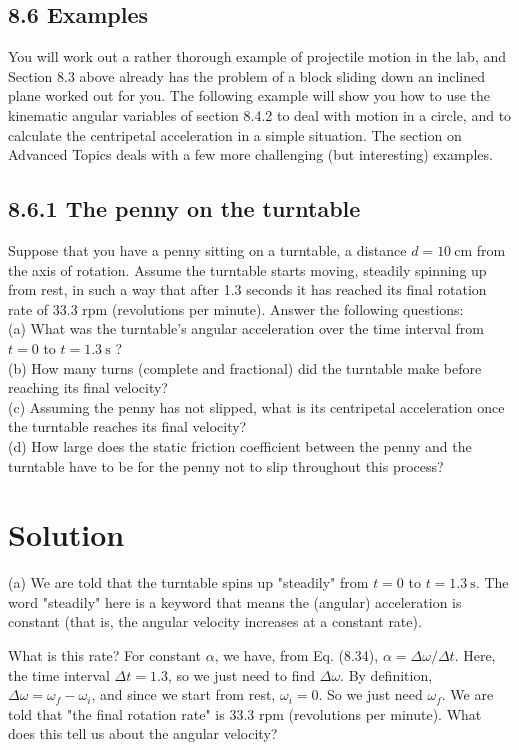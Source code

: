 \documentclass[10pt]{article}
\begin{document}
\subsection*{8.6 Examples}
You will work out a rather thorough example of projectile motion in the lab, and Section 8.3 above already has the problem of a block sliding down an inclined plane worked out for you. The following example will show you how to use the kinematic angular variables of section 8.4.2 to deal with motion in a circle, and to calculate the centripetal acceleration in a simple situation. The section on Advanced Topics deals with a few more challenging (but interesting) examples.

\subsection*{8.6.1 The penny on the turntable}
Suppose that you have a penny sitting on a turntable, a distance $d=10 \mathrm{~cm}$ from the axis of rotation. Assume the turntable starts moving, steadily spinning up from rest, in such a way that after 1.3 seconds it has reached its final rotation rate of 33.3 rpm (revolutions per minute). Answer the following questions:\\
(a) What was the turntable's angular acceleration over the time interval from $t=0$ to $t=1.3 \mathrm{~s}$ ?\\
(b) How many turns (complete and fractional) did the turntable make before reaching its final velocity?\\
(c) Assuming the penny has not slipped, what is its centripetal acceleration once the turntable reaches its final velocity?\\
(d) How large does the static friction coefficient between the penny and the turntable have to be for the penny not to slip throughout this process?

\section*{Solution}
(a) We are told that the turntable spins up "steadily" from $t=0$ to $t=1.3 \mathrm{~s}$. The word "steadily" here is a keyword that means the (angular) acceleration is constant (that is, the angular velocity increases at a constant rate).

What is this rate? For constant $\alpha$, we have, from Eq. (8.34), $\alpha=\Delta \omega / \Delta t$. Here, the time interval $\Delta t=1.3$, so we just need to find $\Delta \omega$. By definition, $\Delta \omega=\omega_{f}-\omega_{i}$, and since we start from rest, $\omega_{i}=0$. So we just need $\omega_{f}$. We are told that "the final rotation rate" is 33.3 rpm (revolutions per minute). What does this tell us about the angular velocity?
\end{document}
